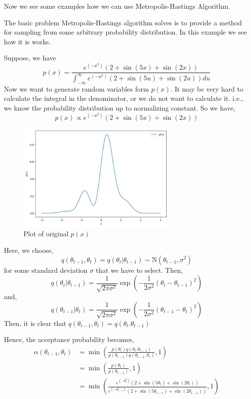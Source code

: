Now we see some examples how we can use Metropolis-Hastings Algorithm.

\begin{example}
	The basic problem Metropolis-Hastings algorithm solves is to provide a method for sampling from some arbitrary probability distribution. In this example we see how it is works.

	Suppose, we have
	\[
		p(x) = \frac{e^{(-x^2)} \left( 2 + \sin(5x) + \sin(2x) \right) }{ \int_{-\infty}^{\infty} e^{(-u^2)} \left( 2 + \sin(5u) + \sin(2u) \right) du }
	\]
	Now we want to generate random variables form $ p(x) $. It may be very hard to calculate the integral in the denominator, or we do not want to calculate it. i.e., we know the probability distribution up to normalizing constant.
	So we have,
	\[
		p(x) \propto e^{(-x^2)} \left( 2 + \sin(5x) + \sin(2x) \right)
	\]
	\begin{figure}[H]
		\centering
		\includegraphics[width=0.7\textwidth]{./images/metropolis/example1/plot-of-px.png}
		\caption{Plot of original $p(x)$}
		\label{plot of px}
	\end{figure}

	Here, we choose,
	\[
		q(\theta_{t-1}, \theta_{t}) = q(\theta_t|\theta_{t-1}) \sim \text{N}(\theta_{t-1},\sigma^2)
	\]
	for some standard deviation $ \sigma $ that we have to select.
	Then,
	\[
		q(\theta_{t} | \theta_{t-1}) = \frac{1}{\sqrt{2 \pi \sigma^2}} \exp \left( - \frac{1}{2 \sigma^2} (\theta_t - \theta_{t-1})^2 \right)
	\]
	and,
	\[
		q(\theta_{t-1}|\theta_t) = \frac{1}{\sqrt{2 \pi \sigma^2}} \exp \left( - \frac{1}{2 \sigma^2} (\theta_{t-1} - \theta_{t})^2 \right)
	\]
	Then, it is clear that $ q(\theta_{t-1},\theta_t) = q(\theta_t.\theta_{t-1}) $

	Hence, the acceptance probability becomes,
	\begin{align*}
		\alpha(\theta_{t-1},\theta_{t}) & = \min \left(  \frac{p(\theta_t)q(\theta_t.\theta_{t-1})}{p(\theta_{t-1})q(\theta_{t-1},\theta_t)}  , 1 \right)                                                        \\
		                                & = \min \left( \frac{p(\theta_t)}{p(\theta_{t-1})} , 1 \right)                                                                                                          \\
		                                & = \min \left( \frac{e^{(-\theta_t^2)}(2 + \sin(5 \theta_t) + \sin(2 \theta_t)) }{e^{(-\theta_{t-1}^2)}(2 + \sin(5 \theta_{t-1}) + \sin(2 \theta_{t-1})) }  , 1 \right)
	\end{align*}


\end{example}
